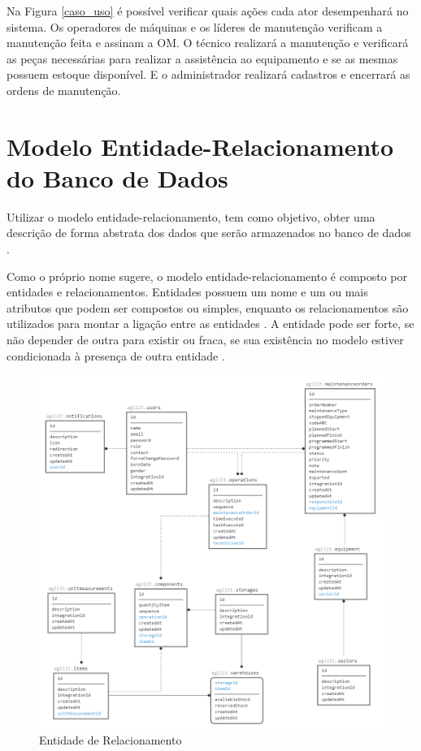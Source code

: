 Na Figura \ref{caso_uso} é possível verificar quais ações cada ator desempenhará no sistema. Os operadores de máquinas e os líderes de manutenção verificam a manutenção feita e assinam a OM. O técnico realizará a manutenção e verificará as peças necessárias para realizar a assistência ao equipamento e se as mesmas possuem estoque disponível. E o administrador realizará cadastros e encerrará as ordens de manutenção.

	
\section{Modelo Entidade-Relacionamento do Banco de Dados}

Utilizar o modelo entidade-relacionamento, tem como objetivo, obter uma descrição de forma abstrata dos dados que serão armazenados no banco de dados \cite{2010_erbd}.

Como o próprio nome sugere, o modelo entidade-relacionamento é composto por entidades e relacionamentos. Entidades possuem um nome e um ou mais atributos que podem ser compostos ou simples, enquanto os relacionamentos são utilizados para montar a ligação entre as entidades \cite{noguera2018extensao}. A entidade pode ser forte, se não depender de outra para existir ou fraca, se sua existência no modelo estiver condicionada à presença de outra entidade \cite{dantas2016analise}.

\begin{figure}[H]
	\caption{\label{entidade_relacionamento}Entidade de Relacionamento}
	\begin{center}
		\includegraphics[scale=0.70]{./Figuras/er3.png}
	\end{center}
\end{figure}

